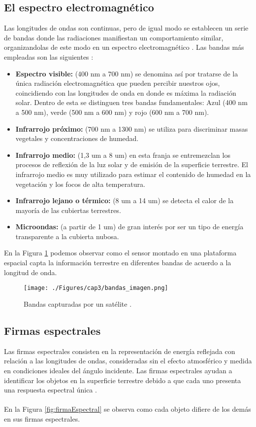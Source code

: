 \subsection{El espectro electromagn\'etico}
Las longitudes de ondas son continuas, pero de igual modo se establecen un serie de bandas donde las radiaciones manifiestan un comportamiento similar, organizandolas de este modo en un espectro electromagn\'etico \cite{remote2010abdulrahman}.
Las bandas m\'as empleadas son las siguientes \cite{salinero2002teledeteccion}:
	\begin{itemize}
		\item \textbf{Espectro visible:} (400 nm a 700 nm) se denomina as\'i por tratarse de la \'unica radiaci\'on electromagn\'etica que pueden percibir nuestros ojos, coincidiendo con las longitudes de onda en donde es m\'axima la radiaci\'on solar. Dentro de esta se distinguen tres bandas fundamentales: Azul (400 nm a 500 nm), verde (500 nm a 600 nm) y rojo (600 nm a 700 nm).
		\item \textbf{Infrarrojo pr\'oximo:} (700 nm a 1300 nm) se utiliza para discriminar masas vegetales y concentraciones de humedad.
		\item \textbf{Infrarrojo medio:} (1,3 um a 8 um) en esta franja se entremezclan los procesos de reflexi\'on de la luz solar y de emisi\'on de la superficie terrestre. El infrarrojo medio es muy utilizado para estimar el contenido de humedad en la vegetaci\'on y los focos de alta temperatura.
		\item \textbf{Infrarrojo lejano o térmico:} (8 um a 14 um) se detecta el calor de la mayor\'ia de las cubiertas terrestres.
		\item \textbf{Microondas:} (a partir de 1 um) de gran inter\'es por ser un tipo de energ\'ia transparente a la cubierta nubosa.
	\end{itemize}
	En la Figura \ref{fig:bandasIs} podemos observar como el sensor montado en una plataforma espacial capta la informaci\'on terrestre en diferentes bandas de acuerdo a la longitud de onda.
	\begin{figure}[H]
		\centering
		\texttt{[image: ./Figures/cap3/bandas\_imagen.png]}
		\caption{Bandas capturadas por un sat\'elite \cite{teledet2015perce}.}
		\label{fig:bandasIs}
	\end{figure}

\subsection{Firmas espectrales}
Las firmas espectrales consisten en la representaci\'on de energ\'ia reflejada con relaci\'on a las longitudes de ondas, consideradas sin el efecto atmosf\'erico y medida en condiciones ideales del \'angulo incidente. Las firmas espectrales ayudan a identificar los objetos en la superficie terrestre debido a que cada uno presenta una respuesta espectral \'unica \cite{sivakumar2004satellite}.\\~\\
En la Figura \ref{fig:firmaEspectral} se observa como cada objeto difiere de los dem\'as en sus firmas espectrales.

